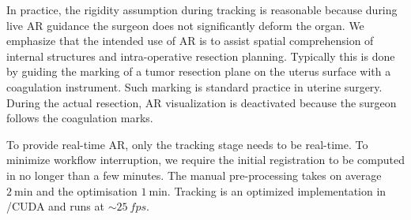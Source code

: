 In practice, the rigidity assumption during tracking is reasonable because during live AR guidance the surgeon does not significantly deform the organ.
We emphasize that the intended use of AR is to assist spatial comprehension of internal structures and intra-operative resection planning. Typically this is done by guiding the marking of a tumor resection plane on the uterus surface with a coagulation instrument. Such marking is standard practice in uterine surgery. During the actual resection, AR visualization is deactivated because the surgeon follows the coagulation marks.

To provide real-time AR, only the tracking stage needs to be real-time. To minimize workflow interruption, we require the initial registration to be computed in no longer than a few minutes. 
The manual pre-processing takes on average $\SI{2}{\minute}$ and the optimisation $\SI{1}{\minute}$.
Tracking is an optimized implementation in \CC/CUDA and runs at $\sim\SI{25}{fps}$.